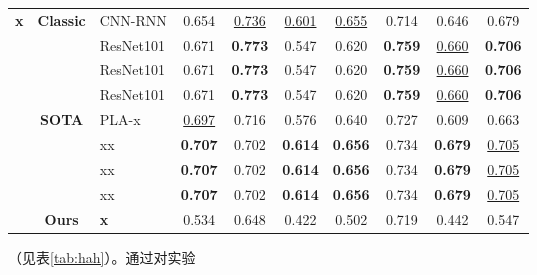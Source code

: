 \begin{table}[h!]
{\begin{tabular}{|*{2}{c||}l||*{6}{c|}c|}
			\multirow{9}{*}{\textbf{x}} & \multirow{4}{*}{\textbf{Classic}} & CNN-RNN\cite{journalkey} & 0.654 & \underline{0.736} & \underline{0.601} & \underline{0.655} & 0.714 & 0.646 & 0.679 \\
			& & ResNet101\cite{journalkey} & 0.671 & \textbf{0.773} & 0.547 & 0.620 & \textbf{0.759} & \underline{0.660} & \textbf{0.706} \\ 
			& & ResNet101\cite{journalkey} & 0.671 & \textbf{0.773} & 0.547 & 0.620 & \textbf{0.759} & \underline{0.660} & \textbf{0.706} \\ 
			& & ResNet101\cite{journalkey} & 0.671 & \textbf{0.773} & 0.547 & 0.620 & \textbf{0.759} & \underline{0.660} & \textbf{0.706} \\  \hhline{|~|*{9}{:=}:}
			& \multirow{4}{*}{\textbf{SOTA}} & PLA-x\cite{conferencekey} & \underline{0.697} & 0.716 & 0.576 & 0.640 & 0.727 & 0.609 & 0.663    \\
			& & xx\cite{conferencekey} & \textbf{0.707} & 0.702 & \textbf{0.614} & \textbf{0.656} & 0.734 & \textbf{0.679} &  \underline{0.705}   \\
			& & xx\cite{conferencekey} & \textbf{0.707} & 0.702 & \textbf{0.614} & \textbf{0.656} & 0.734 & \textbf{0.679} &  \underline{0.705}   \\
			& & xx\cite{conferencekey} & \textbf{0.707} & 0.702 & \textbf{0.614} & \textbf{0.656} & 0.734 & \textbf{0.679} &  \underline{0.705}   \\ \hhline{|~|*{9}{:=}:}
			& \textbf{Ours} & \textbf{x} & 0.534 & 0.648 & 0.422 & 0.502 & 0.719 & 0.442 & 0.547 \\ \hline
		\end{tabular}%
	}
\end{table}

（见表\ref{tab:hah}）。通过对实验

